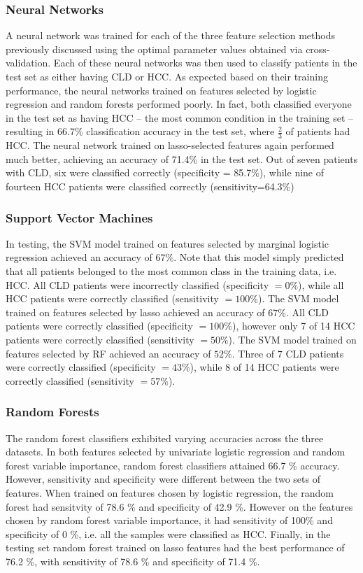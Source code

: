 \documentclass[a4paper]{article}
\begin{document}
\subsubsection{Neural Networks}
A neural network was trained for each of the three feature selection methods previously discussed using the optimal parameter values obtained via cross-validation. Each of these neural networks was then used to classify patients in the test set as either having CLD or HCC. As expected based on their training performance, the neural networks trained on features selected by logistic regression and random forests performed poorly. In fact, both classified everyone in the test set as having HCC -- the most common condition in the training set -- resulting in 66.7\% classification accuracy in the test set, where $\frac{2}{3}$ of patients had HCC. The neural network trained on lasso-selected features again performed much better, achieving an accuracy of 71.4\% in the test set. Out of seven patients with CLD, six were classified correctly (specificity = 85.7\%), while nine of fourteen HCC patients were classified correctly (sensitivity=64.3\%)

\subsubsection{Support Vector Machines}
In testing, the SVM model trained on features selected by marginal logistic regression achieved an accuracy of $67\%$. Note that this model simply predicted that all patients belonged to the most common class in the training data, i.e. HCC. All CLD patients were incorrectly classified (specificity $=0\%$), while all HCC patients were correctly classified (sensitivity $=100\%$). The SVM model trained on features selected by lasso achieved an accuracy of $67\%$. All CLD patients were correctly classified (specificity $=100\%$), however only 7 of 14 HCC patients were correctly classified (sensitivity $=50\%$). The SVM model trained on features selected by RF achieved an accuracy of $52\%$. Three of 7 CLD patients were correctly classified (specificity $=43\%$), while 8 of 14 HCC patients were correctly classified (sensitivity $=57\%$). 

\subsubsection{Random Forests}
The random forest classifiers exhibited varying accuracies across the three datasets. In both features selected by univariate logistic regression and random forest variable importance, random forest classifiers attained 66.7 \% accuracy. However, sensitivity and specificity were different between the two sets of features. When trained on features chosen by logistic regression, the random forest had sensitvity of 78.6 \% and specificity of 42.9 \%. However on the features chosen by random forest variable importance, it had sensitivity of 100\% and specificity of 0 \%, i.e. all the samples were classified as HCC. Finally, in the testing set random forest trained on lasso features had the best performance of 76.2 \%, with sensitivity of 78.6 \% and specificity of 71.4 \%. 
\end{document}
